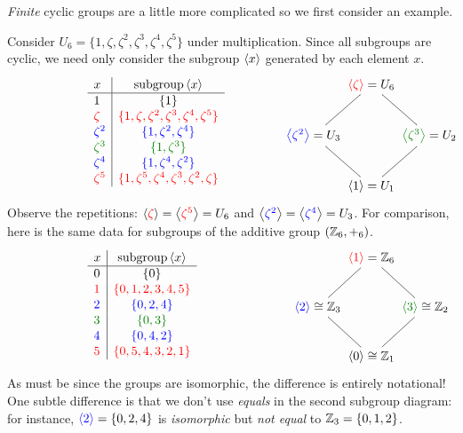 \smallskip


\emph{Finite} cyclic groups are a little more complicated so we first consider an example.

\begin{example}{}{}
	Consider $U_6=\{1,\zeta,\zeta^2,\zeta^3,\zeta^4,\zeta^5\}$ under multiplication. Since all subgroups are cyclic, we need only consider the subgroup $\left\langle x\right\rangle$ generated by each element $x$.
	\[
		\makebox[230pt][l]{%
			$\def\arraystretch{1.05}
			\begin{array}[t]{l|c}
				x & \text{subgroup}\ip x\\ \hline
				1 & \{1 \} \\
				\textcolor{red}{\zeta} & \textcolor{red}{\{1,\zeta,\zeta^2,\zeta^3,\zeta^4,\zeta^5\}}\\
				\textcolor{blue}{\zeta^2} & \textcolor{blue}{\{1,\zeta^2,\zeta^4\}}\\
				\textcolor{Green}{\zeta^3} & \textcolor{Green}{\{1,\zeta^3\}}\\
				\textcolor{blue}{\zeta^4} & \textcolor{blue}{\{1,\zeta^4,\zeta^2\}}\\
				\textcolor{red}{\zeta^5} & \textcolor{red}{\{1,\zeta^5,\zeta^4,\zeta^3,\zeta^2,\zeta\}}
			\end{array}$
		}
		\makebox[0pt][c]{%
			$\xymatrix @C0pt @R24pt{%
				& \textcolor{red}{\ip{\zeta}}=U_6 \ar@{-}[dl] \ar@{-}[dr] & \\
				\textcolor{blue}{\ip{\zeta^2}}=U_3 \ar@{-}[dr] & & \textcolor{Green}{\ip{\zeta^3}}=U_2 \ar@{-}[dl] \\
				& \ip{1}=U_1 &
			}$
		}
	\]
	Observe the repetitions: $\left\langle \textcolor{red}{\zeta}\right\rangle=\left\langle \textcolor{red}{\zeta^5}\right\rangle=U_6$ and $\left\langle \textcolor{blue}{\zeta^2}\right\rangle=\left\langle \textcolor{blue}{\zeta^4}\right\rangle=U_3$.
	\smallbreak
	For comparison, here is the same data for subgroups of the additive group $(\mathbb{Z}_6,+_6)$.
	\[
		\makebox[230pt][l]{%
			$\def\arraystretch{1.05}
			\begin{array}[t]{l|c}
				x & \text{subgroup}\ip x\\ \hline
				0 & \{0\} \\
				\textcolor{red}{1} & \textcolor{red}{\{0,1,2,3,4,5\}}\\
				\textcolor{blue}{2} & \textcolor{blue}{\{0,2,4\}}\\
				\textcolor{Green}{3} & \textcolor{Green}{\{0,3\}}\\
				\textcolor{blue}{4} & \textcolor{blue}{\{0,4,2\}}\\
				\textcolor{red}{5} & \textcolor{red}{\{0,5,4,3,2,1\}}
			\end{array}$
		}
	\makebox[0pt][c]{%
		$\xymatrix @C0pt @R24pt{%
			& \textcolor{red}{\ip{1}}=\Z_6 \ar@{-}[dl] \ar@{-}[dr] & \\
			\textcolor{blue}{\ip{2}}\cong\Z_3 \ar@{-}[dr] & & \textcolor{Green}{\ip{3}}\cong\Z_2 \ar@{-}[dl] \\
			& \ip{0}\cong\Z_1 &
			}$
		}
	\]
	As must be since the groups are isomorphic, the difference is entirely notational! One subtle difference is that we don't use \emph{equals} in the second subgroup diagram: for instance, $\textcolor{blue}{\left\langle 2\right\rangle}=\{0,2,4\}$ is \emph{isomorphic} but \emph{not equal} to $\mathbb{Z}_3=\{0,1,2\}$.
\end{example}

